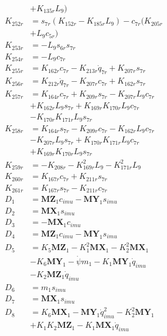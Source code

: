 \begin{multicols}{2}
\begin{align}
&+ K_{135r}L_9) \nonumber \\
K_{252r} &= s_{7r}(K_{152r} - K_{185r}L_9) - c_{7r}(K_{205r}  \nonumber \\
&+ L_9c_{5r}) \nonumber \\
K_{253r} &= -L_9s_{6r}s_{7r} \nonumber \\
K_{254r} &= -L_9c_{7r} \nonumber \\
K_{255r} &= K_{162r}c_{7r} - K_{213r}\dot{q}_{7r} + K_{207r}s_{7r} \nonumber \\
K_{256r} &= K_{212r}\dot{q}_{7r} - K_{207r}c_{7r} + K_{162r}s_{7r} \nonumber \\
K_{257r} &= K_{164r}c_{7r} + K_{209r}s_{7r} - K_{207r}L_9c_{7r}  \nonumber \\
&+ K_{162r}L_9s_{7r} + K_{169r}K_{170r}L_9c_{7r}  \nonumber \\
&- K_{170r}K_{171r}L_9s_{7r} \nonumber \\
K_{258r} &= K_{164r}s_{7r} - K_{209r}c_{7r} - K_{162r}L_9c_{7r}  \nonumber \\
&- K_{207r}L_9s_{7r} + K_{170r}K_{171r}L_9c_{7r}  \nonumber \\
&+ K_{169r}K_{170r}L_9s_{7r} \nonumber \\
K_{259r} &= - K_{208r} - K_{169r}^2L_9 - K_{171r}^2L_9 \nonumber \\
K_{260r} &= K_{167r}c_{7r} + K_{211r}s_{7r} \nonumber \\
K_{261r} &= K_{167r}s_{7r} - K_{211r}c_{7r} \nonumber \\
D_{1} &= \mathbf{MZ}_1c_{imu} - \mathbf{MY}_1s_{imu} \nonumber \\
D_{2} &= \mathbf{MX}_1s_{imu} \nonumber \\
D_{3} &= -\mathbf{MX}_1c_{imu} \nonumber \\
D_{4} &= \mathbf{MZ}_1c_{imu} - \mathbf{MY}_1s_{imu} \nonumber \\
D_{5} &= K_{5}\mathbf{MZ}_1 - K_{1}^2\mathbf{MX}_1 - K_{2}^2\mathbf{MX}_1  \nonumber \\
&- K_{6}\mathbf{MY}_1 - \dot{\psi}m_1 - K_{1}\mathbf{MY}_1\dot{q}_{imu}  \nonumber \\
&- K_{2}\mathbf{MZ}_1\dot{q}_{imu} \nonumber \\
D_{6} &= m_1s_{imu} \nonumber \\
D_{7} &= \mathbf{MX}_1s_{imu} \nonumber \\
D_{8} &= K_{6}\mathbf{MX}_1 - \mathbf{MY}_1\dot{q}_{imu}^2 - K_{2}^2\mathbf{MY}_1  \nonumber \\
&+ K_{1}K_{2}\mathbf{MZ}_1 - K_{1}\mathbf{MX}_1\dot{q}_{imu} \nonumber \\

\end{align}
\end{multicols}
